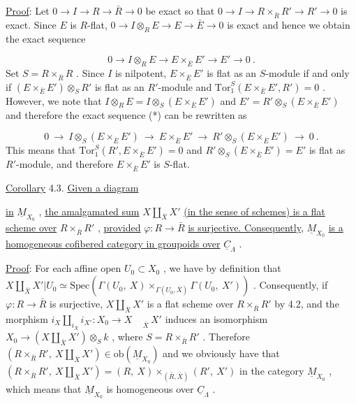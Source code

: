 \underline{Proof}:  Let  $0 \to I \to R \to \bar{R} \to 0$  be exact so that  $0 \to I \to R \times_{\bar{R}} R' \to R' \to 0$  is exact. Since  $E$  is $R$-flat,  $0 \to I \otimes_R E \to E \to \bar{E} \to 0$  is exact and hence we obtain the exact sequence

\begin{equation}\tag{*}
0 \to I \otimes_R E \to E \times_{\bar{E}} E' \to E' \to 0 \ .
\end{equation}
Set  $S = R \times_{\bar{R}} R$ . Since  $I$  is nilpotent,  $E \times_{\bar{E}} E'$  is flat as an $S$-module if and only if  $(E \times_{\bar{E}} E') \otimes_S R'$  is flat as an $R'$-module and  $\mathrm{Tor}_1^S (E \times_{\bar{E}} E', R') = 0$ . However, we note that  $I \otimes_R E = I \otimes_S (E \times_{\bar{E}} E')$  and  $E' = R' \otimes_S (E \times_{\bar{E}} E')$  and therefore the exact sequence (*) can be rewritten as

\begin{equation*}
0 \ \to \ I \otimes_S (E \times_{\bar{E}} E') \ \to \ E \times_{\bar{E}} E' \ \to \ R' \otimes_S (E \times_{\bar{E}} E') \ \to \ 0 \ .
\end{equation*}
This means that  $\mathrm{Tor}_1^S (R', E \times_{\bar{E}} E') = 0$  and  $R' \otimes_S (E \times_{\bar{E}} E') = E'$  is flat as $R'$-module, and therefore  $E \times_{\bar{E}} E'$  is $S$-flat.

\underline{Corollary} 4.3.  \underline{Given a diagram}

\begin{center}
\end{center}
\underline{in}  $\underline{M}_{X_0}$ , \underline{the amalgamated sum}  $X \underset{\bar{X}}{\amalg} X'$  \underline{(in the sense of schemes) is a flat scheme over}  $R \times_{\bar{R}} R'$ , \underline{provided}  $\varphi : R \to \bar{R}$  \underline{is surjective. Consequently,}  $\underline{M}_{X_0}$ \underline{is a homogeneous cofibered category in groupoids over}  $\underline{C}_\Lambda$ .

\underline{Proof}:  For each affine open  $U_0 \subset X_0$ , we have by definition that $X \underset{\bar{X}}{\amalg} X'|U_0 \simeq \mathrm{Spec}(\Gamma(U_0,\ X) \times_{\Gamma(U_0,\bar{X})} \Gamma(U_0,\ X'))$ . Consequently, if  $\varphi : R \to \bar{R}$ is surjective,  $X \underset{\bar{X}}{\amalg} X'$  is a flat scheme over  $R \times_{\bar{R}} R'$  by 4.2, and the morphism $i_X \underset{i_{\bar{X}}}{\amalg} i_{X'} : X_0 \to X \underset{\bar{X}}{\phantom{\amalg}} X'$  induces an isomorphism  $X_0 \to (X \underset{\bar{X}}{\amalg} X') \otimes_S k$ , where $S = R \times_{\bar{R}} R'$ . Therefore  $(R \times_{\bar{R}} R' ,\ X \underset{\bar{X}}{\amalg} X') \in \mathrm{ob}(\underline{M}_{X_0})$  and we obviously have that  $(R \times_{\bar{R}} R',\ X \underset{\bar{X}}{\amalg} X') = (R,\ X) \times_{(\bar{R},\bar{X})} (R',\ X')$  in the category  $\underline{M}_{X_0}$ , which
means that $\underline{M}_{X_0}$ is homogeneous over $\underline{C}_\Lambda$ .


